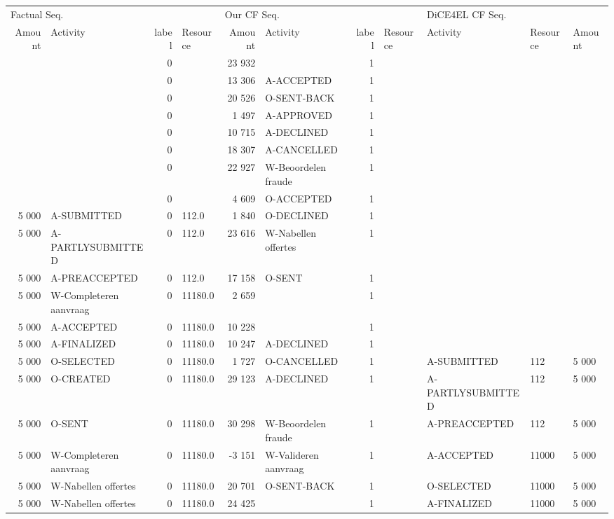 \begin{tabular}{rlrlrlrllll}
\toprule
\multicolumn{4}{l}{Factual Seq.} & \multicolumn{4}{l}{Our CF Seq.} & \multicolumn{3}{l}{DiCE4EL CF Seq.} \\
Amount & Activity & label & Resource & Amount & Activity & label & Resource & Activity & Resource & Amount \\
\midrule
 &  & 0 &  & 23 932 &  & 1 &  &  &  &  \\
 &  & 0 &  & 13 306 & A-ACCEPTED & 1 &  &  &  &  \\
 &  & 0 &  & 20 526 & O-SENT-BACK & 1 &  &  &  &  \\
 &  & 0 &  & 1 497 & A-APPROVED & 1 &  &  &  &  \\
 &  & 0 &  & 10 715 & A-DECLINED & 1 &  &  &  &  \\
 &  & 0 &  & 18 307 & A-CANCELLED & 1 &  &  &  &  \\
 &  & 0 &  & 22 927 & W-Beoordelen fraude & 1 &  &  &  &  \\
 &  & 0 &  & 4 609 & O-ACCEPTED & 1 &  &  &  &  \\
5 000 & A-SUBMITTED & 0 & 112.0 & 1 840 & O-DECLINED & 1 &  &  &  &  \\
5 000 & A-PARTLYSUBMITTED & 0 & 112.0 & 23 616 & W-Nabellen offertes & 1 &  &  &  &  \\
5 000 & A-PREACCEPTED & 0 & 112.0 & 17 158 & O-SENT & 1 &  &  &  &  \\
5 000 & W-Completeren aanvraag & 0 & 11180.0 & 2 659 &  & 1 &  &  &  &  \\
5 000 & A-ACCEPTED & 0 & 11180.0 & 10 228 &  & 1 &  &  &  &  \\
5 000 & A-FINALIZED & 0 & 11180.0 & 10 247 & A-DECLINED & 1 &  &  &  &  \\
5 000 & O-SELECTED & 0 & 11180.0 & 1 727 & O-CANCELLED & 1 &  & A-SUBMITTED & 112 & 5 000 \\
5 000 & O-CREATED & 0 & 11180.0 & 29 123 & A-DECLINED & 1 &  & A-PARTLYSUBMITTED & 112 & 5 000 \\
5 000 & O-SENT & 0 & 11180.0 & 30 298 & W-Beoordelen fraude & 1 &  & A-PREACCEPTED & 112 & 5 000 \\
5 000 & W-Completeren aanvraag & 0 & 11180.0 & -3 151 & W-Valideren aanvraag & 1 &  & A-ACCEPTED & 11000 & 5 000 \\
5 000 & W-Nabellen offertes & 0 & 11180.0 & 20 701 & O-SENT-BACK & 1 &  & O-SELECTED & 11000 & 5 000 \\
5 000 & W-Nabellen offertes & 0 & 11180.0 & 24 425 &  & 1 &  & A-FINALIZED & 11000 & 5 000 \\

\end{tabular}
